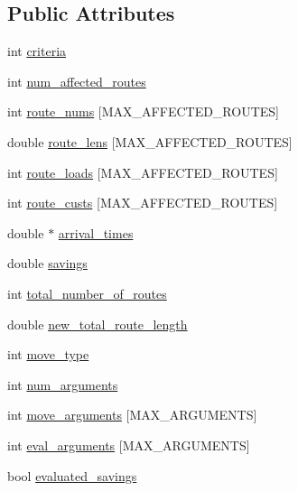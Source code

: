 \subsection*{Public Attributes}
\begin{DoxyCompactItemize}
\item 
int \hyperlink{class_v_r_p_move_a964ab5cd85cfcccc2acc8b8088980d5d}{criteria}
\item 
int \hyperlink{class_v_r_p_move_abf5a4ac08176a9fb85bd5ebf7ef1e1ee}{num\_\-affected\_\-routes}
\item 
int \hyperlink{class_v_r_p_move_ad806f6cdca7081fc5ae7d087a8d4180f}{route\_\-nums} \mbox{[}MAX\_\-AFFECTED\_\-ROUTES\mbox{]}
\item 
double \hyperlink{class_v_r_p_move_aea86fc574c4e56c9b1ae0564d0de2ea6}{route\_\-lens} \mbox{[}MAX\_\-AFFECTED\_\-ROUTES\mbox{]}
\item 
int \hyperlink{class_v_r_p_move_a4761d4ac82fb507e7afa8196b3f9a288}{route\_\-loads} \mbox{[}MAX\_\-AFFECTED\_\-ROUTES\mbox{]}
\item 
int \hyperlink{class_v_r_p_move_abba2be357b8d777d3f72119b87839c55}{route\_\-custs} \mbox{[}MAX\_\-AFFECTED\_\-ROUTES\mbox{]}
\item 
double $\ast$ \hyperlink{class_v_r_p_move_aba411d099643f23e20f32d3ab2858438}{arrival\_\-times}
\item 
double \hyperlink{class_v_r_p_move_a824d4dbc2ba2328d6d6f9a361dc979d7}{savings}
\item 
int \hyperlink{class_v_r_p_move_a37f85cb82daea77577c4ed1583c758df}{total\_\-number\_\-of\_\-routes}
\item 
double \hyperlink{class_v_r_p_move_a4000655bc1ea3c24788b8a3aa1a33153}{new\_\-total\_\-route\_\-length}
\item 
int \hyperlink{class_v_r_p_move_aceb961e33e98ba0060b48a9f9c8a77e6}{move\_\-type}
\item 
int \hyperlink{class_v_r_p_move_a2873c7ab303640f54785f8d9d705df98}{num\_\-arguments}
\item 
int \hyperlink{class_v_r_p_move_a1a900aa1d2953581afb639b6d899d59c}{move\_\-arguments} \mbox{[}MAX\_\-ARGUMENTS\mbox{]}
\item 
int \hyperlink{class_v_r_p_move_a4328a652db3307d16e8a0a09df47c3bb}{eval\_\-arguments} \mbox{[}MAX\_\-ARGUMENTS\mbox{]}
\item 
bool \hyperlink{class_v_r_p_move_ad6a7403e76e701bde510f50afecfa50e}{evaluated\_\-savings}
\end{DoxyCompactItemize}


